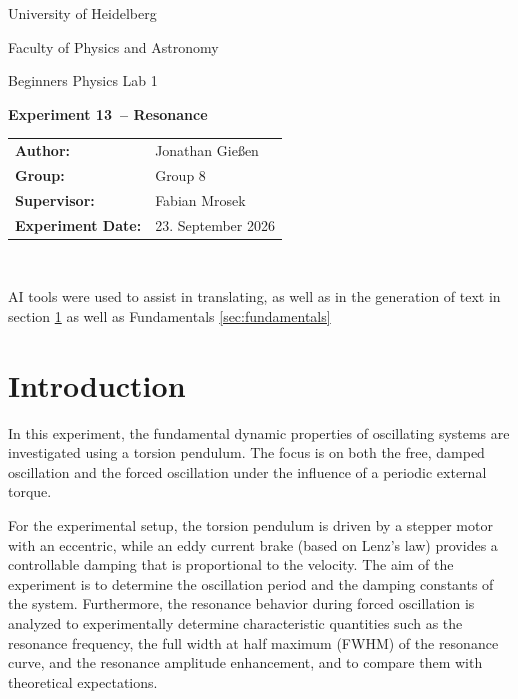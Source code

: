 \documentclass[12pt,a4paper,titlepage]{scrartcl}
\numberwithin{equation}{section}
\numberwithin{table}{section}
\numberwithin{figure}{section}
\newcommand{\versuch}{Experiment 13}
\newcommand{\titel}{Resonance}
\newcommand{\praktikum}{Beginners Physics Lab 1}
\newcommand{\autor}{Jonathan Gießen}
\newcommand{\gruppe}{Group 8}
\newcommand{\datum}{23. September 2026}
\newcommand{\betreuer}{Fabian Mrosek}
\begin{document}
\pagestyle{scrheadings}

\begin{titlepage}



    \centering
    \vspace*{4cm}
    {\large University of Heidelberg\par}
    {\small Faculty of Physics and Astronomy\par}
    {\Large \praktikum\par}
    \vspace{0.8cm}
    {\LARGE \bfseries \versuch\ -- \titel\par}
    \vspace{1.5cm}

    \begin{tabular}{ll}
        \textbf{Author:} & \autor\\
        \textbf{Group:} & \gruppe\\
        \textbf{Supervisor:} & \betreuer\\
        \textbf{Experiment Date:} & \datum\\
    \end{tabular}

    \vfill
    \hrulefill\
\end{titlepage}

\tableofcontents

\bigskip
\begin{tcolorbox}[colback=gray!5,colframe=gray!60,boxrule=0.8pt,arc=0.01mm,title=AI-Disclaimer]
    AI tools were used to assist in translating, as well as in the generation of text in section \ref{sec:Einleitung} as well as Fundamentals \ref{sec:fundamentals}
\end{tcolorbox}

\clearpage


\section{Introduction}\label{sec:Einleitung}
In this experiment, the fundamental dynamic properties of oscillating systems are investigated using a torsion pendulum. The focus is on both the free, damped oscillation and the forced oscillation under the influence of a periodic external torque. 

For the experimental setup, the torsion pendulum is driven by a stepper motor with an eccentric, while an eddy current brake (based on Lenz's law) provides a controllable damping that is proportional to the velocity. The aim of the experiment is to determine the oscillation period and the damping constants of the system. Furthermore, the resonance behavior during forced oscillation is analyzed to experimentally determine characteristic quantities such as the resonance frequency, the full width at half maximum (FWHM) of the resonance curve, and the resonance amplitude enhancement, and to compare them with theoretical expectations.
\end{document}

